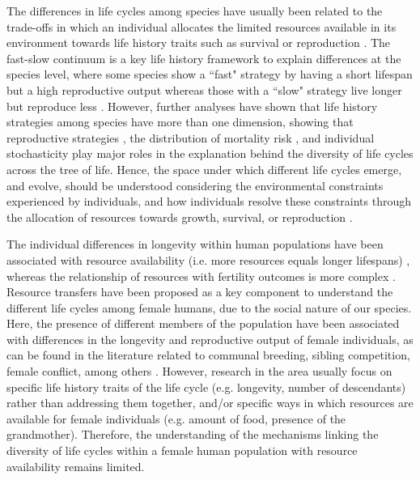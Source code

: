 \documentclass{article}
\begin{document}
The differences in life cycles among species have usually been related to the trade-offs in which an individual allocates the limited resources available in its environment towards life history traits such as survival or reproduction \citep{stearns2000life}. The fast-slow continuum is a key life history framework to explain differences at the species level, where some species show a ``fast" strategy by having a short lifespan but a high reproductive output whereas those with a ``slow" strategy live longer but reproduce less \citep{stearns1983influence}. However, further analyses have shown that life history strategies among species have more than one dimension, showing that reproductive strategies \citep{salguero2016fast}, the distribution of mortality risk \citep{healy2019animal}, and individual stochasticity \citep{varas2022individual} play major roles in the explanation behind the diversity of life cycles across the tree of life. Hence, the space under which different life cycles emerge, and evolve, should be understood considering the environmental constraints experienced by individuals, and how individuals resolve these constraints through the allocation of resources towards growth, survival, or reproduction \citep{white2022metabolic}.

The individual differences in longevity within human populations have been associated with resource availability (i.e. more resources equals longer lifespans) \citep{kaplan2003embodied}, whereas the relationship of resources with fertility outcomes is more complex \citep{mulder1998demographic,sear2016understanding}. Resource transfers have been proposed as a key component to understand the different life cycles among female humans, due to the social nature of our species. Here, the presence of different members of the population have been associated with differences in the longevity and reproductive output of female individuals, as can be found in the literature related to communal breeding, sibling competition, female conflict, among others \citep{ivey2000cooperative,nitsch2013elder,mace2012female,sear2011much}. However, research in the area usually focus on specific life history traits of the life cycle (e.g. longevity, number of descendants) rather than addressing them together, and/or specific ways in which resources are available for female individuals (e.g. amount of food, presence of the grandmother). Therefore, the understanding of the mechanisms linking the diversity of life cycles within a female human population with resource availability remains limited.
\end{document}
